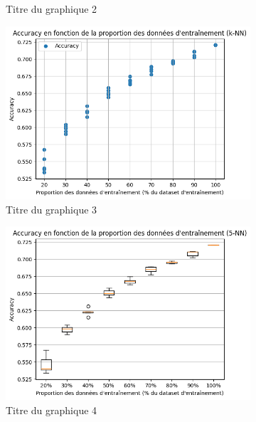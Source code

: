 \documentclass[12pt]{article}
\begin{document}
\begin{figure}[H]
\begin{subfigure}[t]{0.49\textwidth}
        \caption{Titre du graphique 2}
    \end{subfigure}
    \hfill
    \begin{subfigure}[t]{0.35\textwidth}
        \centering
        \includegraphics[width=\textwidth]{static/knn_cam_5_raw.png}
        \caption{Titre du graphique 3}
    \end{subfigure}
    \hfill
    \begin{subfigure}[t]{0.35\textwidth}
        \centering
        \includegraphics[width=\textwidth]{static/knn_cam_5.png}
        \caption{Titre du graphique 4}
    \end{subfigure}
    \hfill
    \begin{subfigure}[t]{0.35\textwidth}
        \centering

\end{subfigure}
\end{figure}
\end{document}
